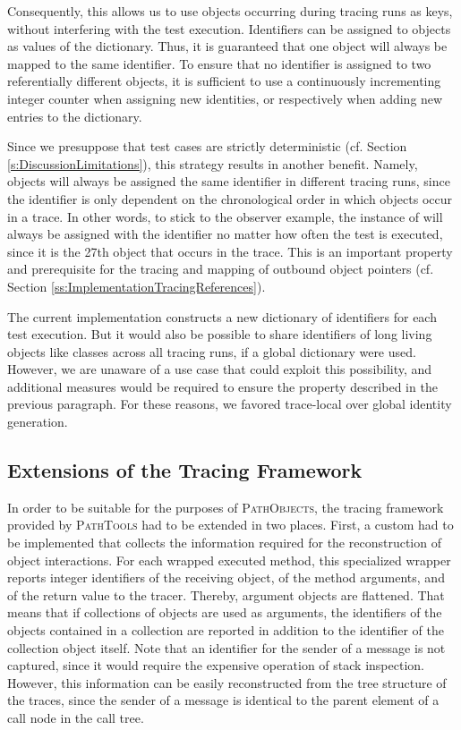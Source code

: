 Consequently, this allows us to use objects occurring during tracing runs as keys, without interfering with the test execution.
Identifiers can be assigned to objects as values of the dictionary.
Thus, it is guaranteed that one object will always be mapped to the same identifier.
To ensure that no identifier is assigned to two referentially different objects, it is sufficient to use a continuously incrementing integer counter when assigning new identities, or respectively when adding new entries to the dictionary.

Since we presuppose that test cases are strictly deterministic (cf. Section \ref{s:DiscussionLimitations}), this strategy results in another benefit.
Namely, objects will always be assigned the same identifier in different tracing runs, since the identifier is only dependent on the chronological order in which objects occur in a trace.
In other words, to stick to the observer example, the instance of  will always be assigned with the identifier  no matter how often the test is executed, since it is the 27th object that occurs in the trace.
This is an important property and prerequisite for the tracing and mapping of outbound object pointers (cf. Section \ref{ss:ImplementationTracingReferences}).

The current implementation constructs a new dictionary of identifiers for each test execution.
But it would also be possible to share identifiers of long living objects like classes across all tracing runs, if a global dictionary were used.
However, we are unaware of a use case that could exploit this possibility, and additional measures would be required to ensure the property described in the previous paragraph.
For these reasons, we favored trace-local over global identity generation.

\subsection{Extensions of the Tracing Framework}
\label{ss:ImplementationTracing}
In order to be suitable for the purposes of \textsc{PathObjects}, the tracing framework provided by \textsc{PathTools} had to be extended in two places.
First, a custom  had to be implemented that collects the information required for the reconstruction of object interactions.
For each wrapped executed method, this specialized wrapper reports integer identifiers of the receiving object, of the method arguments, and of the return value to the tracer.
Thereby, argument objects are flattened.
That means that if collections of objects are used as arguments, the identifiers of the objects contained in a collection are reported in addition to the identifier of the collection object itself.
Note that an identifier for the sender of a message is not captured, since it would require the expensive operation of stack inspection.
However, this information can be easily reconstructed from the tree structure of the traces, since the sender of a message is identical to the parent element of a call node in the call tree.

